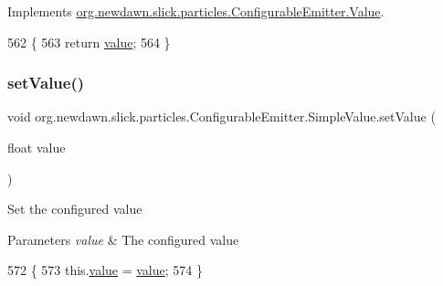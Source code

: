 Implements \mbox{\hyperlink{interfaceorg_1_1newdawn_1_1slick_1_1particles_1_1_configurable_emitter_1_1_value_aa5f167090202b78c65e324edd27e277c}{org.\+newdawn.\+slick.\+particles.\+Configurable\+Emitter.\+Value}}.


\begin{DoxyCode}
562                                           \{
563             \textcolor{keywordflow}{return} \mbox{\hyperlink{classorg_1_1newdawn_1_1slick_1_1particles_1_1_configurable_emitter_1_1_simple_value_a660ac8ed4db304925cecaf64165c1f3e}{value}};
564         \}
\end{DoxyCode}
\mbox{\label{classorg_1_1newdawn_1_1slick_1_1particles_1_1_configurable_emitter_1_1_simple_value_a660fa1466cfb78894f3b3d3dc1ee7767}} 
\subsubsection{\texorpdfstring{set\+Value()}{setValue()}}
{\footnotesize\ttfamily void org.\+newdawn.\+slick.\+particles.\+Configurable\+Emitter.\+Simple\+Value.\+set\+Value (\begin{DoxyParamCaption}\item[{float}]{value }\end{DoxyParamCaption})\hspace{0.3cm}{\ttfamily [inline]}}

Set the configured value


\begin{DoxyParams}{Parameters}
{\em value} & The configured value \\
\hline
\end{DoxyParams}

\begin{DoxyCode}
572                                           \{
573             this.\mbox{\hyperlink{classorg_1_1newdawn_1_1slick_1_1particles_1_1_configurable_emitter_1_1_simple_value_a660ac8ed4db304925cecaf64165c1f3e}{value}} = \mbox{\hyperlink{classorg_1_1newdawn_1_1slick_1_1particles_1_1_configurable_emitter_1_1_simple_value_a660ac8ed4db304925cecaf64165c1f3e}{value}};
574         \}
\end{DoxyCode}


